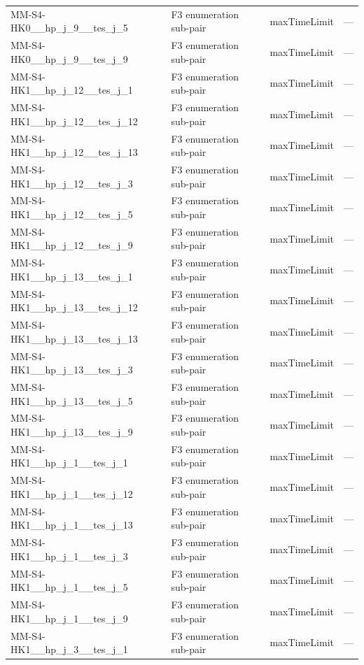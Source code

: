 \begin{table}[htbp]
\begin{tabular}{lllr}
  MM-S4-HK0\_\_hp\_j\_9\_\_tes\_j\_5 & F3 enumeration sub-pair & maxTimeLimit & — \\
  MM-S4-HK0\_\_hp\_j\_9\_\_tes\_j\_9 & F3 enumeration sub-pair & maxTimeLimit & — \\
  MM-S4-HK1\_\_hp\_j\_12\_\_tes\_j\_1 & F3 enumeration sub-pair & maxTimeLimit & — \\
  MM-S4-HK1\_\_hp\_j\_12\_\_tes\_j\_12 & F3 enumeration sub-pair & maxTimeLimit & — \\
  MM-S4-HK1\_\_hp\_j\_12\_\_tes\_j\_13 & F3 enumeration sub-pair & maxTimeLimit & — \\
  MM-S4-HK1\_\_hp\_j\_12\_\_tes\_j\_3 & F3 enumeration sub-pair & maxTimeLimit & — \\
  MM-S4-HK1\_\_hp\_j\_12\_\_tes\_j\_5 & F3 enumeration sub-pair & maxTimeLimit & — \\
  MM-S4-HK1\_\_hp\_j\_12\_\_tes\_j\_9 & F3 enumeration sub-pair & maxTimeLimit & — \\
  MM-S4-HK1\_\_hp\_j\_13\_\_tes\_j\_1 & F3 enumeration sub-pair & maxTimeLimit & — \\
  MM-S4-HK1\_\_hp\_j\_13\_\_tes\_j\_12 & F3 enumeration sub-pair & maxTimeLimit & — \\
  MM-S4-HK1\_\_hp\_j\_13\_\_tes\_j\_13 & F3 enumeration sub-pair & maxTimeLimit & — \\
  MM-S4-HK1\_\_hp\_j\_13\_\_tes\_j\_3 & F3 enumeration sub-pair & maxTimeLimit & — \\
  MM-S4-HK1\_\_hp\_j\_13\_\_tes\_j\_5 & F3 enumeration sub-pair & maxTimeLimit & — \\
  MM-S4-HK1\_\_hp\_j\_13\_\_tes\_j\_9 & F3 enumeration sub-pair & maxTimeLimit & — \\
  MM-S4-HK1\_\_hp\_j\_1\_\_tes\_j\_1 & F3 enumeration sub-pair & maxTimeLimit & — \\
  MM-S4-HK1\_\_hp\_j\_1\_\_tes\_j\_12 & F3 enumeration sub-pair & maxTimeLimit & — \\
  MM-S4-HK1\_\_hp\_j\_1\_\_tes\_j\_13 & F3 enumeration sub-pair & maxTimeLimit & — \\
  MM-S4-HK1\_\_hp\_j\_1\_\_tes\_j\_3 & F3 enumeration sub-pair & maxTimeLimit & — \\
  MM-S4-HK1\_\_hp\_j\_1\_\_tes\_j\_5 & F3 enumeration sub-pair & maxTimeLimit & — \\
  MM-S4-HK1\_\_hp\_j\_1\_\_tes\_j\_9 & F3 enumeration sub-pair & maxTimeLimit & — \\
  MM-S4-HK1\_\_hp\_j\_3\_\_tes\_j\_1 & F3 enumeration sub-pair & maxTimeLimit & — \\

\end{tabular}
\end{table}
